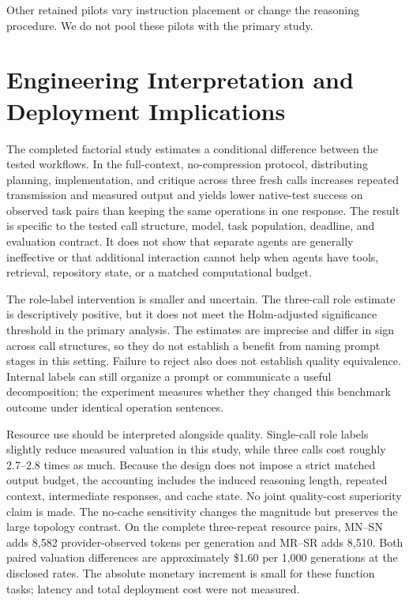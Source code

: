 Other retained pilots vary instruction placement or change the reasoning procedure. We do not pool these pilots with the primary study.



\section{Engineering Interpretation and Deployment Implications}
\aieditnote
The completed factorial study estimates a conditional difference between the tested workflows. In the full-context, no-compression protocol, distributing planning, implementation, and critique across three fresh calls increases repeated transmission and measured output and yields lower native-test success on observed task pairs than keeping the same operations in one response. The result is specific to the tested call structure, model, task population, deadline, and evaluation contract. It does not show that separate agents are generally ineffective or that additional interaction cannot help when agents have tools, retrieval, repository state, or a matched computational budget.

The role-label intervention is smaller and uncertain. The three-call role estimate is descriptively positive, but it does not meet the Holm-adjusted significance threshold in the primary analysis. The estimates are imprecise and differ in sign across call structures, so they do not establish a benefit from naming prompt stages in this setting. Failure to reject also does not establish quality equivalence. Internal labels can still organize a prompt or communicate a useful decomposition; the experiment measures whether they changed this benchmark outcome under identical operation sentences.

Resource use should be interpreted alongside quality. Single-call role labels slightly reduce measured valuation in this study, while three calls cost roughly 2.7--2.8 times as much. Because the design does not impose a strict matched output budget, the accounting includes the induced reasoning length, repeated context, intermediate responses, and cache state. No joint quality-cost superiority claim is made. The no-cache sensitivity changes the magnitude but preserves the large topology contrast. On the complete three-repeat resource pairs, MN--SN adds 8,582 provider-observed tokens per generation and MR--SR adds 8,510. Both paired valuation differences are approximately \$1.60 per 1,000 generations at the disclosed rates. The absolute monetary increment is small for these function tasks; latency and total deployment cost were not measured.

